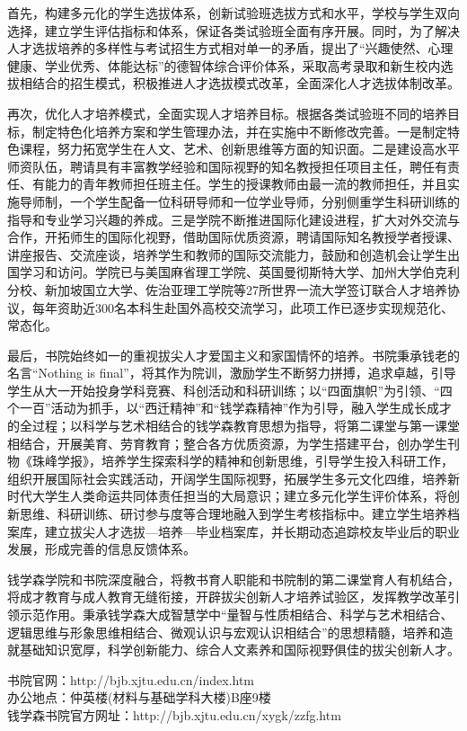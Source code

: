\documentclass[
decoration,  %
]{qyxf-book}
\begin{document}
	首先，构建多元化的学生选拔体系，创新试验班选拔方式和水平，学校与学生双向选择，建立学生评估指标和体系，保证各类试验班全面有序开展。同时，为了解决人才选拔培养的多样性与考试招生方式相对单一的矛盾，提出了“兴趣使然、心理健康、学业优秀、体能达标”的德智体综合评价体系，采取高考录取和新生校内选拔相结合的招生模式，积极推进人才选拔模式改革，全面深化人才选拔体制改革。
	
	再次，优化人才培养模式，全面实现人才培养目标。根据各类试验班不同的培养目标，制定特色化培养方案和学生管理办法，并在实施中不断修改完善。一是制定特色课程，努力拓宽学生在人文、艺术、创新思维等方面的知识面。二是建设高水平师资队伍，聘请具有丰富教学经验和国际视野的知名教授担任项目主任，聘任有责任、有能力的青年教师担任班主任。学生的授课教师由最一流的教师担任，并且实施导师制，一个学生配备一位科研导师和一位学业导师，分别侧重学生科研训练的指导和专业学习兴趣的养成。三是学院不断推进国际化建设进程，扩大对外交流与合作，开拓师生的国际化视野，借助国际优质资源，聘请国际知名教授学者授课、讲座报告、交流座谈，培养学生和教师的国际交流能力，鼓励和创造机会让学生出国学习和访问。学院已与美国麻省理工学院、英国曼彻斯特大学、加州大学伯克利分校、新加坡国立大学、佐治亚理工学院等27所世界一流大学签订联合人才培养协议，每年资助近300名本科生赴国外高校交流学习，此项工作已逐步实现规范化、常态化。
	
	最后，书院始终如一的重视拔尖人才爱国主义和家国情怀的培养。书院秉承钱老的名言“Nothing is final”，将其作为院训，激励学生不断努力拼搏，追求卓越，引导学生从大一开始投身学科竞赛、科创活动和科研训练；以“四面旗帜”为引领、“四个一百”活动为抓手，以“西迁精神”和“钱学森精神”作为引导，融入学生成长成才的全过程；以科学与艺术相结合的钱学森教育思想为指导，将第二课堂与第一课堂相结合，开展美育、劳育教育；整合各方优质资源，为学生搭建平台，创办学生刊物《珠峰学报》，培养学生探索科学的精神和创新思维，引导学生投入科研工作，组织开展国际社会实践活动，开阔学生国际视野，拓展学生多元文化四维，培养新时代大学生人类命运共同体责任担当的大局意识；建立多元化学生评价体系，将创新思维、科研训练、研讨参与度等合理地融入到学生考核指标中。建立学生培养档案库，建立拔尖人才选拔—培养—毕业档案库，并长期动态追踪校友毕业后的职业发展，形成完善的信息反馈体系。
	
	钱学森学院和书院深度融合，将教书育人职能和书院制的第二课堂育人有机结合，将成才教育与成人教育无缝衔接，开辟拔尖创新人才培养试验区，发挥教学改革引领示范作用。秉承钱学森大成智慧学中“量智与性质相结合、科学与艺术相结合、逻辑思维与形象思维相结合、微观认识与宏观认识相结合”的思想精髓，培养和造就基础知识宽厚，科学创新能力、综合人文素养和国际视野俱佳的拔尖创新人才。
	
	\noindent 书院官网：http://bjb.xjtu.edu.cn/index.htm\\
	办公地点：仲英楼(材料与基础学科大楼)B座9楼\\
	钱学森书院官方网址：http://bjb.xjtu.edu.cn/xygk/zzfg.htm\\
	
\end{document}

